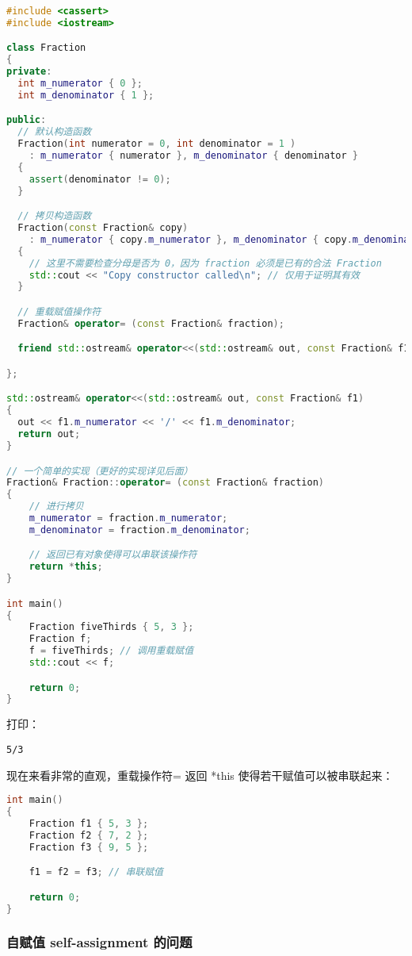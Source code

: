 \documentclass[../../LearnCpp.tex]{subfiles}
\begin{document}
\begin{lstlisting}[language=C++]
#include <cassert>
#include <iostream>

class Fraction
{
private:
  int m_numerator { 0 };
  int m_denominator { 1 };

public:
  // 默认构造函数
  Fraction(int numerator = 0, int denominator = 1 )
    : m_numerator { numerator }, m_denominator { denominator }
  {
    assert(denominator != 0);
  }

  // 拷贝构造函数
  Fraction(const Fraction& copy)
    : m_numerator { copy.m_numerator }, m_denominator { copy.m_denominator }
  {
    // 这里不需要检查分母是否为 0，因为 fraction 必须是已有的合法 Fraction
    std::cout << "Copy constructor called\n"; // 仅用于证明其有效
  }

  // 重载赋值操作符
  Fraction& operator= (const Fraction& fraction);

  friend std::ostream& operator<<(std::ostream& out, const Fraction& f1);

};

std::ostream& operator<<(std::ostream& out, const Fraction& f1)
{
  out << f1.m_numerator << '/' << f1.m_denominator;
  return out;
}

// 一个简单的实现（更好的实现详见后面）
Fraction& Fraction::operator= (const Fraction& fraction)
{
    // 进行拷贝
    m_numerator = fraction.m_numerator;
    m_denominator = fraction.m_denominator;

    // 返回已有对象使得可以串联该操作符
    return *this;
}

int main()
{
    Fraction fiveThirds { 5, 3 };
    Fraction f;
    f = fiveThirds; // 调用重载赋值
    std::cout << f;

    return 0;
}
\end{lstlisting}

打印：

\begin{lstlisting}
5/3
\end{lstlisting}

现在来看非常的直观，重载操作符= 返回 *this 使得若干赋值可以被串联起来：

\begin{lstlisting}[language=C++]
int main()
{
    Fraction f1 { 5, 3 };
    Fraction f2 { 7, 2 };
    Fraction f3 { 9, 5 };

    f1 = f2 = f3; // 串联赋值

    return 0;
}
\end{lstlisting}

\subsubsection*{自赋值 self-assignment 的问题}
\end{document}
